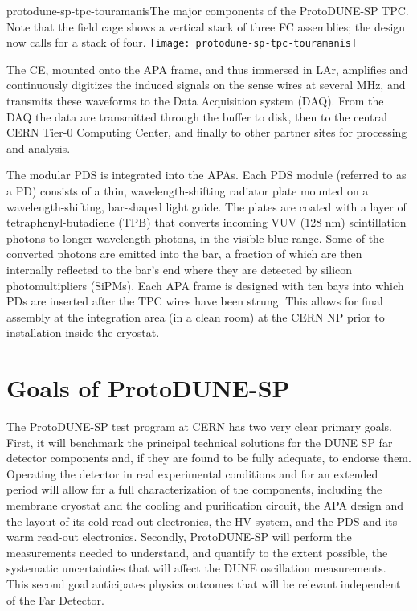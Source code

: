 \begin{cdrfigure}{protodune-sp-tpc-touramanis}{The major components of the ProtoDUNE-SP TPC. Note that the field cage shows a vertical stack of three FC assemblies; the design now calls for a stack of four.}
\texttt{[image: protodune-sp-tpc-touramanis]}
\end{cdrfigure}

The CE, mounted onto the APA frame, and thus immersed in LAr, amplifies and continuously digitizes the induced signals on the sense wires at several MHz, and transmits these waveforms to the Data Acquisition system (DAQ). From the DAQ the data are  transmitted through the buffer to disk, then to the central CERN Tier-0 Computing Center, and finally to other partner sites for processing and analysis.  

The modular PDS is integrated into the APAs. Each PDS module (referred to as a PD) consists of a thin, wavelength-shifting radiator plate mounted on a wavelength-shifting, bar-shaped light guide. The plates are coated with a
layer of tetraphenyl-butadiene (TPB) that converts incoming VUV (128 nm) 
scintillation photons to longer-wavelength photons, in the visible blue range. Some of the converted photons are emitted into the bar, a fraction of which are then internally reflected to the bar's end where they are detected by silicon photomultipliers (SiPMs).
Each APA frame is designed with ten bays into which PDs are inserted after the TPC wires have been strung. This  allows for final assembly at the integration area (in a clean room) at the CERN NP prior to installation inside the cryostat. 



\section{Goals of ProtoDUNE-SP}
\label{intro:goals}

The ProtoDUNE-SP test program at CERN has two very clear primary goals. First, it will benchmark the principal technical solutions for the DUNE SP far detector components and, if they are found to be fully adequate, to endorse them. 
Operating the detector in real experimental conditions and for an extended period will allow for a full characterization of the components, including the membrane cryostat and the cooling and purification circuit, the APA design and the layout of its cold read-out electronics, the HV system, and the PDS and its warm read-out electronics.
%
Secondly, ProtoDUNE-SP will perform the measurements needed to understand, and quantify to the extent possible, the systematic uncertainties that will affect the DUNE oscillation measurements. This second goal anticipates physics outcomes that will be relevant independent of the Far Detector.

